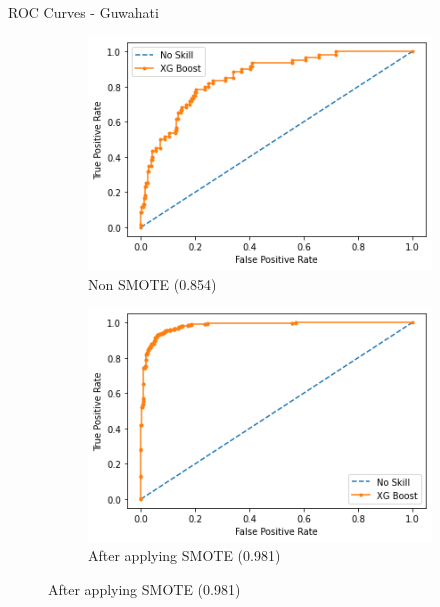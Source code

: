 \documentclass[11pt]{beamer}
\begin{document}
\begin{frame}{ROC Curves - Guwahati}
\begin{figure}[!h]
\begin{subfigure}{.5\textwidth}
\centering
\includegraphics[width=.8\linewidth]{guwahati_normal.png}
\caption{Non SMOTE (0.854)}
\end{subfigure}%
\begin{subfigure}{.5\textwidth}
\centering
\includegraphics[width=.8\linewidth]{guwahati_smote.png}
\caption{After applying SMOTE (0.981)}
\end{subfigure}
\end{figure}
\end{frame}
\end{document}
